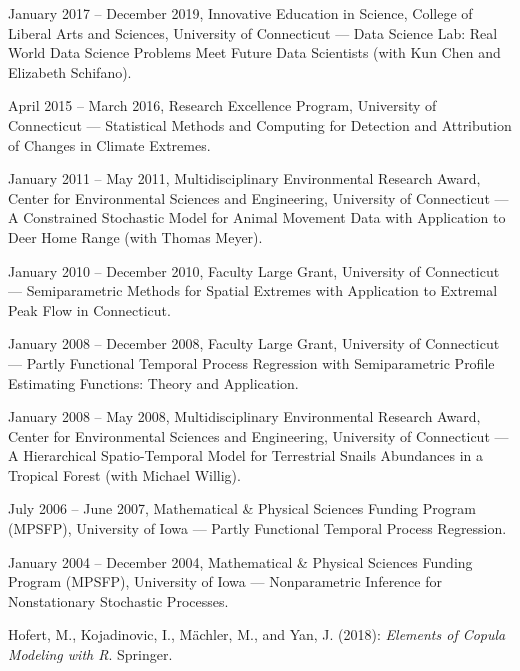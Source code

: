 \documentclass[Statistics]{vita}
\begin{document}
\begin{vita}
\begin{Grants}
\begin{Internal}
  \item January 2017 -- December 2019, Innovative Education in Science, College of Liberal Arts and Sciences, University of Connecticut --- Data Science Lab: Real World Data Science Problems Meet Future Data Scientists (with Kun Chen and Elizabeth Schifano).
  \item April 2015 -- March 2016, Research Excellence Program, University of Connecticut --- Statistical Methods and Computing for Detection and Attribution of Changes in Climate Extremes.
  \item January 2011 -- May 2011, Multidisciplinary Environmental Research Award, Center for Environmental Sciences and Engineering, University of Connecticut --- A Constrained Stochastic Model for Animal Movement Data with Application to Deer Home Range (with Thomas Meyer).
  \item January 2010 -- December 2010, Faculty Large Grant, University of Connecticut --- Semiparametric Methods for Spatial Extremes with Application to Extremal Peak Flow in Connecticut.
  \item January 2008 -- December 2008, Faculty Large Grant, University of Connecticut --- Partly Functional Temporal Process Regression with Semiparametric Profile Estimating Functions: Theory and Application.
  \item January 2008 -- May 2008, Multidisciplinary Environmental Research Award, Center for Environmental Sciences and Engineering, University of Connecticut --- A Hierarchical Spatio-Temporal Model for Terrestrial Snails Abundances in a Tropical Forest (with Michael Willig).
  \item July 2006 -- June 2007, Mathematical \& Physical Sciences Funding Program (MPSFP), University of Iowa --- Partly Functional Temporal Process Regression.
  \item January 2004 -- December 2004, Mathematical \& Physical Sciences Funding Program (MPSFP), University of Iowa --- Nonparametric Inference for Nonstationary Stochastic Processes.
  \end{Internal}
\end{Grants}
\begin{Publications}
%   
%      
  \begin{Books}
  \item Hofert, M., Kojadinovic, I., M\"achler, M., and Yan, J. (2018): {\em Elements of Copula Modeling with R\/}. Springer. 

\end{Books}
\end{Publications}
\end{vita}
\end{document}
